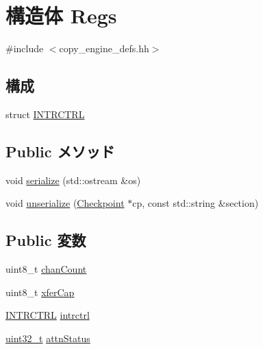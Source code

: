 \hypertarget{structCopyEngineReg_1_1Regs}{
\section{構造体 Regs}
\label{structCopyEngineReg_1_1Regs}
}


{\ttfamily \#include $<$copy\_\-engine\_\-defs.hh$>$}\subsection*{構成}
\begin{DoxyCompactItemize}
\item 
struct \hyperlink{structCopyEngineReg_1_1Regs_1_1INTRCTRL}{INTRCTRL}
\end{DoxyCompactItemize}
\subsection*{Public メソッド}
\begin{DoxyCompactItemize}
\item 
void \hyperlink{structCopyEngineReg_1_1Regs_a53e036786d17361be4c7320d39c99b84}{serialize} (std::ostream \&os)
\item 
void \hyperlink{structCopyEngineReg_1_1Regs_af22e5d6d660b97db37003ac61ac4ee49}{unserialize} (\hyperlink{classCheckpoint}{Checkpoint} $\ast$cp, const std::string \&section)
\end{DoxyCompactItemize}
\subsection*{Public 変数}
\begin{DoxyCompactItemize}
\item 
uint8\_\-t \hyperlink{structCopyEngineReg_1_1Regs_a72591202604201c764b2d2330de87eb9}{chanCount}
\item 
uint8\_\-t \hyperlink{structCopyEngineReg_1_1Regs_ad07b5a14bd75791ecb3aec74efe132ac}{xferCap}
\item 
\hyperlink{structCopyEngineReg_1_1Regs_1_1INTRCTRL}{INTRCTRL} \hyperlink{structCopyEngineReg_1_1Regs_adb90603779b60249df8136e1537ebeb7}{intrctrl}
\item 
\hyperlink{Type_8hh_a435d1572bf3f880d55459d9805097f62}{uint32\_\-t} \hyperlink{structCopyEngineReg_1_1Regs_a96b8c5009091673411f229448c8d2de1}{attnStatus}
\end{DoxyCompactItemize}


